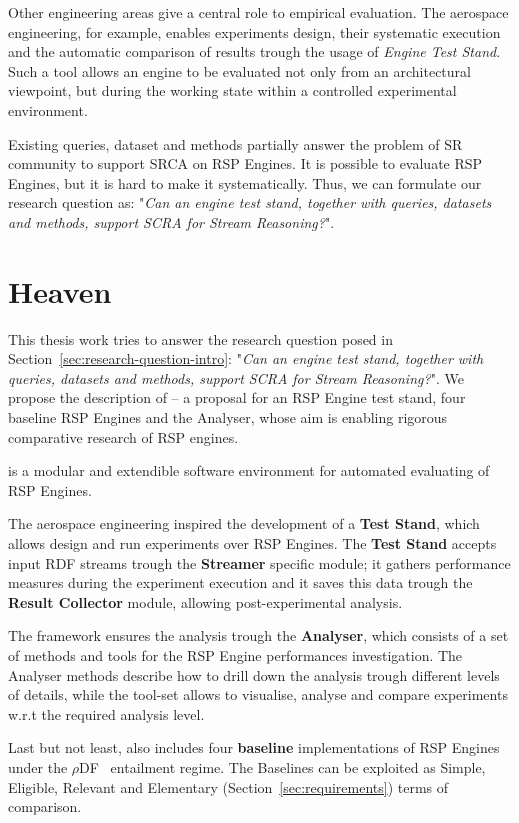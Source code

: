 Other engineering areas give a central role to empirical evaluation. The aerospace engineering, for example, enables experiments design, their systematic execution and the automatic comparison of results trough the usage of \textit{Engine Test Stand}. Such a tool allows an engine to be evaluated not only from an architectural viewpoint, but during the working state within a controlled experimental environment.

Existing queries, dataset and methods partially answer the problem of SR community to support SRCA on RSP Engines. It is possible to evaluate RSP Engines, but it is hard to make it systematically. Thus, we can formulate our research question as: "\textit{Can an engine test stand, together with queries, datasets and methods, support SCRA for Stream Reasoning?}".

\section{Heaven}\label{sec:heaven-intro}

This thesis work tries to answer the research question posed in Section~\ref{sec:research-question-intro}: "\textit{Can an engine test stand, together with queries, datasets and methods, support SCRA for Stream Reasoning?}". We propose the description of \name -- a proposal for an RSP Engine test stand, four baseline RSP Engines and the Analyser, whose aim is enabling rigorous comparative research of RSP engines. 

\name is a modular and extendible software environment for automated evaluating of RSP Engines. 

The aerospace engineering inspired the development of a \textbf{Test Stand}, which allows design and run experiments over RSP Engines. The \textbf{Test Stand} accepts input RDF streams trough the \textbf{Streamer} specific module; it gathers performance measures during the experiment execution and it saves this data trough the \textbf{Result Collector} module, allowing post-experimental analysis.

The framework ensures the analysis trough the \textbf{Analyser}, which consists of a set of methods and tools for the RSP Engine performances investigation. The Analyser methods describe how to drill down the analysis trough different levels of details, while the tool-set allows to visualise, analyse and compare experiments w.r.t the required analysis level. 

Last but not least, \name also includes four \textbf{baseline} implementations of RSP Engines under the $\rho$DF~\cite{DBLP:conf/esws/MunozPG07} entailment regime. The Baselines can be exploited  as Simple, Eligible, Relevant and Elementary (Section~\ref{sec:requirements}) terms of comparison.  

